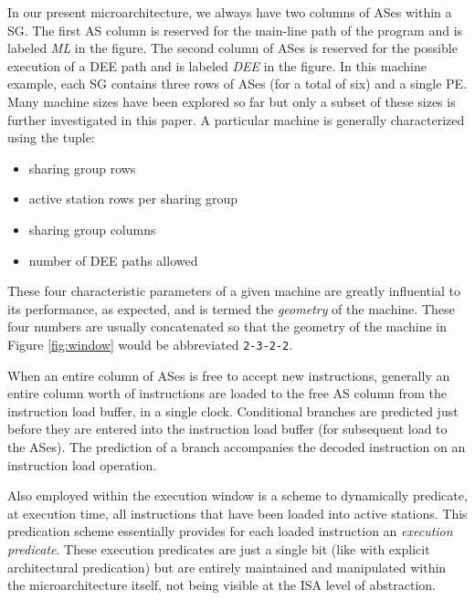 \documentclass[10pt,dvips]{article}
\begin{document}
In our present microarchitecture, we always have two 
columns of ASes within a SG.
The first AS column is
reserved for the main-line
path of the program and is
labeled \textit{ML}
in the figure.
The second column of ASes is reserved for the possible
execution of a DEE path and is
labeled \textit{DEE}
in the figure.
In this machine example, each SG contains three rows of ASes
(for a total of six) and a single PE.
Many machine sizes have been explored so far but only a subset
of these sizes is further investigated in this paper.
A particular machine is generally characterized using the tuple: 
%
\begin{itemize}
\item{sharing group rows}
\item{active station rows per sharing group}
\item{sharing group columns}
\item{number of DEE paths allowed}
\end{itemize}   
%
These four characteristic parameters of a given machine
are greatly influential to its performance, as expected,
and is termed the \textit{geometry} 
of the machine.
These four numbers are usually concatenated
so that the geometry of the machine in Figure \ref{fig:window}
would be abbreviated {\tt 2-3-2-2}.

When an entire column
of ASes is free to accept new instructions, generally
an entire column worth of instructions are loaded to the free AS
column from the instruction load buffer, in a single clock.  
Conditional branches are
predicted just before they are entered into the instruction
load buffer (for subsequent load to the ASes).
The prediction of a branch accompanies the decoded instruction
on an instruction load operation.

Also employed within the execution window is a scheme to
dynamically predicate, at execution time, 
all instructions that have been loaded
into active stations.  
This predication scheme essentially provides for each loaded instruction
an \textit{execution predicate}.  These execution predicates
are just a single bit (like with explicit architectural predication)
but are entirely maintained and manipulated within the microarchitecture
itself, not being visible at the ISA level of abstraction.
%
%
\end{document}
